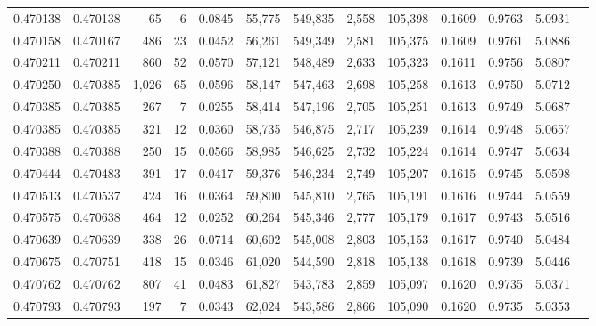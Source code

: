 \begin{tabular}{rrrrrrrrrrrrr}
0.470138 & 0.470138 &    65 &     6 &                                     0.0845 &  55,775 & 549,835 &   2,558 & 105,398 & 0.1609 & 0.9763 & 5.0931 \\
0.470158 & 0.470167 &   486 &    23 &                                     0.0452 &  56,261 & 549,349 &   2,581 & 105,375 & 0.1609 & 0.9761 & 5.0886 \\
0.470211 & 0.470211 &   860 &    52 &                                     0.0570 &  57,121 & 548,489 &   2,633 & 105,323 & 0.1611 & 0.9756 & 5.0807 \\
0.470250 & 0.470385 & 1,026 &    65 &                                     0.0596 &  58,147 & 547,463 &   2,698 & 105,258 & 0.1613 & 0.9750 & 5.0712 \\
0.470385 & 0.470385 &   267 &     7 &                                     0.0255 &  58,414 & 547,196 &   2,705 & 105,251 & 0.1613 & 0.9749 & 5.0687 \\
0.470385 & 0.470385 &   321 &    12 &                                     0.0360 &  58,735 & 546,875 &   2,717 & 105,239 & 0.1614 & 0.9748 & 5.0657 \\
0.470388 & 0.470388 &   250 &    15 &                                     0.0566 &  58,985 & 546,625 &   2,732 & 105,224 & 0.1614 & 0.9747 & 5.0634 \\
0.470444 & 0.470483 &   391 &    17 &                                     0.0417 &  59,376 & 546,234 &   2,749 & 105,207 & 0.1615 & 0.9745 & 5.0598 \\
0.470513 & 0.470537 &   424 &    16 &                                     0.0364 &  59,800 & 545,810 &   2,765 & 105,191 & 0.1616 & 0.9744 & 5.0559 \\
0.470575 & 0.470638 &   464 &    12 &                                     0.0252 &  60,264 & 545,346 &   2,777 & 105,179 & 0.1617 & 0.9743 & 5.0516 \\
0.470639 & 0.470639 &   338 &    26 &                                     0.0714 &  60,602 & 545,008 &   2,803 & 105,153 & 0.1617 & 0.9740 & 5.0484 \\
0.470675 & 0.470751 &   418 &    15 &                                     0.0346 &  61,020 & 544,590 &   2,818 & 105,138 & 0.1618 & 0.9739 & 5.0446 \\
0.470762 & 0.470762 &   807 &    41 &                                     0.0483 &  61,827 & 543,783 &   2,859 & 105,097 & 0.1620 & 0.9735 & 5.0371 \\
0.470793 & 0.470793 &   197 &     7 &                                     0.0343 &  62,024 & 543,586 &   2,866 & 105,090 & 0.1620 & 0.9735 & 5.0353 \\

\end{tabular}
